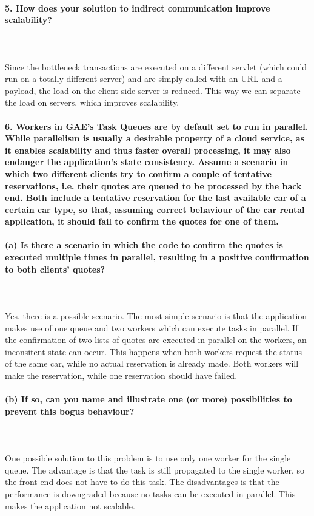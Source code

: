 \documentclass{ds-report}
\begin{document}
	\paragraph{5. How does your solution to indirect communication improve scalability?} \mbox{}\\\\
Since the bottleneck transactions are executed on a different servlet (which could run on a totally different server) and are simply called with an URL and a payload, the load on the client-side server is reduced. This way we can separate the load on servers, which improves scalability.

		\paragraph{6. Workers in GAE’s Task Queues are by default set to run in parallel. While parallelism is usually a desirable property of a cloud service, as it enables scalability and thus faster overall processing, it may also endanger the application’s state consistency. Assume a scenario in which two different clients try to confirm a couple of tentative reservations, i.e. their quotes are queued to be processed by the back end. Both include a tentative reservation for the last available car of a certain car type, so that, assuming correct behaviour of the car rental application, it should fail to confirm the quotes for one of them.} \mbox{}
\paragraph{(a) Is there a scenario in which the code to confirm the quotes is executed multiple times in parallel,
resulting in a positive confirmation to both clients’ quotes?}\mbox{}\\\\
Yes, there is a possible scenario. The most simple scenario is that the application makes use of one queue and two workers which can execute tasks in parallel. If the confirmation of two lists of quotes are executed in parallel on the workers, an inconsitent state can occur. This happens when both workers request the status of the same car, while no actual reservation is already made. Both workers will make the reservation, while one reservation should have failed.

\paragraph{(b) If so, can you name and illustrate one (or more) possibilities to prevent this bogus behaviour?}\mbox{}\\\\
One possible solution to this problem is to use only one worker for the single queue. The advantage is that the task is still propagated to the single worker, so the front-end does not have to do this task. The disadvantages is that the performance is downgraded because no tasks can be executed in parallel. This makes the application not scalable.
\clearpage
\end{document}
